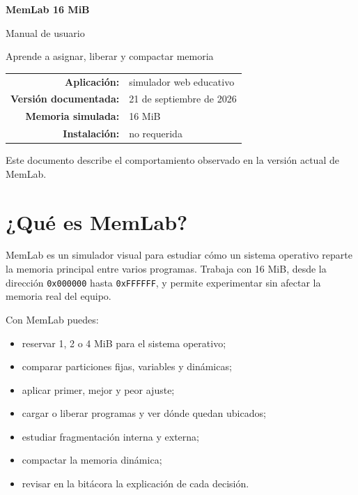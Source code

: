 \documentclass[11pt,a4paper]{article}
\begin{document}
\begin{titlepage}
  \centering
  \vspace*{2.2cm}
  {\sffamily\bfseries\fontsize{34}{39}\selectfont\color{MemBlue} MemLab 16 MiB\par}
  \vspace{0.5cm}
  {\sffamily\fontsize{23}{28}\selectfont Manual de usuario\par}
  \vspace{0.8cm}
  {\Large Aprende a asignar, liberar y compactar memoria\par}
  \vfill
  \begin{tabular}{rl}
    \textbf{Aplicación:} & simulador web educativo\\
    \textbf{Versión documentada:} & 21 de septiembre de 2026\\
    \textbf{Memoria simulada:} & 16 MiB\\
    \textbf{Instalación:} & no requerida\\
  \end{tabular}
  \vfill
  {\small Este documento describe el comportamiento observado en la versión actual de MemLab.\par}
\end{titlepage}

\tableofcontents
\newpage

\section{¿Qué es MemLab?}

MemLab es un simulador visual para estudiar cómo un sistema operativo reparte la
memoria principal entre varios programas. Trabaja con 16 MiB, desde la dirección
\texttt{0x000000} hasta \texttt{0xFFFFFF}, y permite experimentar sin afectar la
memoria real del equipo.

Con MemLab puedes:

\begin{itemize}
  \item reservar 1, 2 o 4 MiB para el sistema operativo;
  \item comparar particiones fijas, variables y dinámicas;
  \item aplicar primer, mejor y peor ajuste;
  \item cargar o liberar programas y ver dónde quedan ubicados;
  \item estudiar fragmentación interna y externa;
  \item compactar la memoria dinámica;
  \item revisar en la bitácora la explicación de cada decisión.
\end{itemize}
\end{document}
